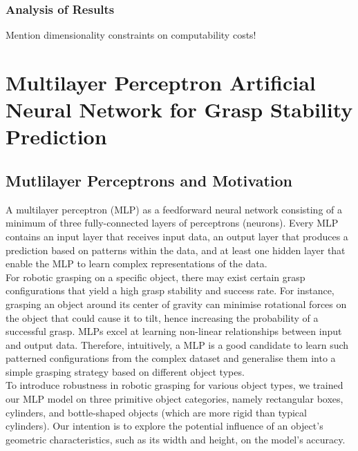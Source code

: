 \documentclass[12pt, a4paper]{report}
\theoremstyle{definition}
\begin{document}
\subsection{Analysis of Results}
\label{sec:4.6.2}
Mention dimensionality constraints on computability costs!



\chapter{Multilayer Perceptron Artificial Neural Network for Grasp Stability Prediction}
\label{chap:5}

\section{Mutlilayer Perceptrons and Motivation}
\label{sec:5.1}
A multilayer perceptron (MLP) as a feedforward neural network consisting of a minimum of three fully-connected layers of perceptrons (neurons). Every MLP contains an input layer that receives input data, an output layer that produces a prediction based on patterns within the data, and at least one hidden layer that enable the MLP to learn complex representations of the data.\\

For robotic grasping on a specific object, there may exist certain grasp configurations that yield a high grasp stability and success rate. For instance, grasping an object around its center of gravity can minimise rotational forces on the object that could cause it to tilt, hence increasing the probability of a successful grasp. MLPs excel at learning non-linear relationships between input and output data. Therefore, intuitively, a MLP is a good candidate to learn such patterned configurations from the complex dataset and generalise them into a simple grasping strategy based on different object types.\\

To introduce robustness in robotic grasping for various object types, we trained our MLP model on three primitive object categories, namely rectangular boxes, cylinders, and bottle-shaped objects (which are more rigid than typical cylinders). Our intention is to explore the potential influence of an object's geometric characteristics, such as its width and height, on the model's accuracy.
\end{document}
